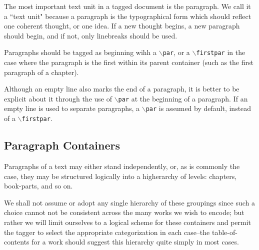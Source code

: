 \documentclass[11pt]{article}
\newcommand{\cmd}[1]{{\tt $\backslash$#1}}
\begin{document}



The most important text unit in a tagged document is the paragraph. We
call it a ``text unit" because a paragraph is the typographical form
which should reflect one coherent thought, or one idea. If a new
thought begins, a new paragraph should begin, and if not, only
linebreaks should be used.

Paragraphs should be tagged as beginning wihh a \cmd{par}, or a
\cmd{firstpar} in the case where the paragraph is the first within its
parent container (such as the first paragraph of a chapter).

Although an empty line also marks the end of a paragraph, it is better
to be explicit about it through the use of \cmd{par} at the beginning
of a paragraph. If an empty line is used to separate paragraphs, a
\cmd{par} is assumed by default, instead of a \cmd{firstpar}.


\subsection{Paragraph Containers}

Paragraphs of a text may either stand independently, or, as is
commonly the case, they may be structured logically into a higherarchy
of levels: chapters, book-parts, and so on.

We shall not assume or adopt any single hierarchy of these groupings
since such a choice cannot not be consistent across the many works we
wish to encode; but rather we will limit ourselves to a logical scheme
for these containers and permit the tagger to select the appropriate
categorization in each case--the table-of-contents for a work should
suggest this hierarchy quite simply in most cases.
\end{document}
